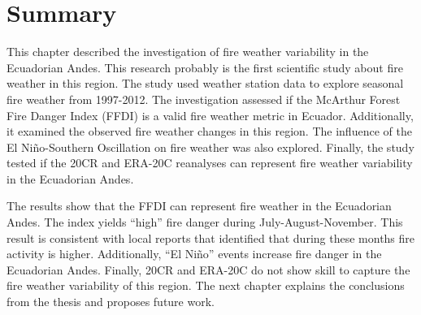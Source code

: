 \section{Summary}

This chapter described the investigation of fire weather variability
in the Ecuadorian Andes. This research probably is the first scientific
study about fire weather in this region. The study used weather station
data to explore seasonal fire weather from 1997-2012. The investigation
assessed if the McArthur Forest Fire Danger Index (FFDI) is a valid
fire weather metric in Ecuador. Additionally, it examined the observed
fire weather changes in this region. The influence of the El Ni\~no-Southern
Oscillation on fire weather was also explored. Finally, the study
tested if the 20CR and ERA-20C reanalyses can represent fire weather
variability in the Ecuadorian Andes. 

The results show that the FFDI can represent fire weather in the Ecuadorian
Andes. The index yields ``high'' fire danger during July-August-November.
This result is consistent with local reports that identified that
during these months fire activity is higher. Additionally, \textquotedblleft El
Ni\~no\textquotedblright{} events increase fire danger in the Ecuadorian
Andes. Finally, 20CR and ERA-20C do not show skill to capture the
fire weather variability of this region. The next chapter explains
the conclusions from the thesis and proposes future work.

